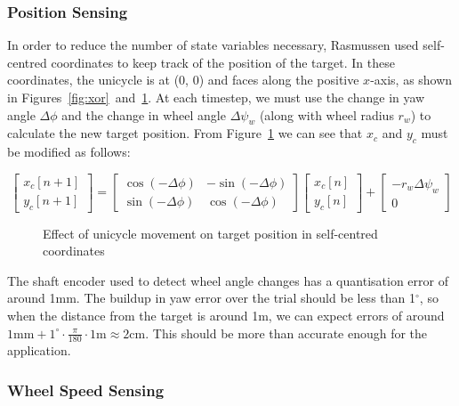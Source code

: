 \documentclass{IIBproject}
\begin{document}
\subsubsection{Position Sensing}
\label{sec:position_sensing}

In order to reduce the number of state variables necessary, Rasmussen used
self-centred coordinates to keep track of the position of the target. In these
coordinates, the unicycle is at (0, 0) and faces along the positive $x$-axis,
as shown in Figures~\ref{fig:xor}~and~\ref{fig:scc}. At each timestep, we must
use the change in yaw angle $\Delta\phi$ and the change in wheel angle
$\Delta\psi_w$ (along with wheel radius $r_w$) to calculate the new target
position. From Figure~\ref{fig:scc} we can see that $x_c$ and $y_c$ must be
modified as follows:

\[
\begin{bmatrix}
  x_c[n+1] \\
  y_c[n+1]
\end{bmatrix} =
\begin{bmatrix}
  \cos(-\Delta\phi) & -\sin(-\Delta\phi) \\
  \sin(-\Delta\phi) & \cos(-\Delta\phi)
\end{bmatrix}
\begin{bmatrix}
  x_c[n] \\
  y_c[n]
\end{bmatrix} +
\begin{bmatrix}
  -r_w\Delta \psi_w \\
  0
\end{bmatrix}
\]

\begin{figure}[htpb]
  \begin{center}
    \def\svgwidth{15cm}
    
    \end{center}
    \caption{Effect of unicycle movement on target position in self-centred
    coordinates}
    \label{fig:scc}
    \end{figure}

The shaft encoder used to detect wheel angle changes has a quantisation error
of around 1mm. The buildup in yaw error over the trial should be less than
1$^\circ$, so when the distance from the target is around 1m, we can expect
errors of around $1\textrm{mm} + 1^\circ \cdot \frac{\pi}{180} \cdot
1\textrm{m} \approx 2$cm.  This should be more than accurate enough for the
application.

\subsubsection{Wheel Speed Sensing}
\end{document}

